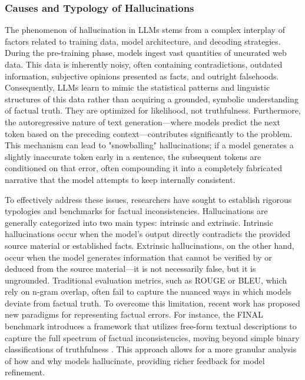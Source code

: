 \documentclass[11pt,a4paper]{article}
\begin{document}
\subsubsection{Causes and Typology of Hallucinations}

The phenomenon of hallucination in LLMs stems from a complex interplay of factors related to training data, model architecture, and decoding strategies. During the pre-training phase, models ingest vast quantities of uncurated web data. This data is inherently noisy, often containing contradictions, outdated information, subjective opinions presented as facts, and outright falsehoods. Consequently, LLMs learn to mimic the statistical patterns and linguistic structures of this data rather than acquiring a grounded, symbolic understanding of factual truth. They are optimized for likelihood, not truthfulness. Furthermore, the autoregressive nature of text generation---where models predict the next token based on the preceding context---contributes significantly to the problem. This mechanism can lead to "snowballing" hallucinations; if a model generates a slightly inaccurate token early in a sentence, the subsequent tokens are conditioned on that error, often compounding it into a completely fabricated narrative that the model attempts to keep internally consistent.

To effectively address these issues, researchers have sought to establish rigorous typologies and benchmarks for factual inconsistencies. Hallucinations are generally categorized into two main types: intrinsic and extrinsic. Intrinsic hallucinations occur when the model's output directly contradicts the provided source material or established facts. Extrinsic hallucinations, on the other hand, occur when the model generates information that cannot be verified by or deduced from the source material---it is not necessarily false, but it is ungrounded. Traditional evaluation metrics, such as ROUGE or BLEU, which rely on n-gram overlap, often fail to capture the nuanced ways in which models deviate from factual truth. To overcome this limitation, recent work has proposed new paradigms for representing factual errors. For instance, the FINAL benchmark introduces a framework that utilizes free-form textual descriptions to capture the full spectrum of factual inconsistencies, moving beyond simple binary classifications of truthfulness \cite{Peisakhovsky_2025_LLMs}. This approach allows for a more granular analysis of how and why models hallucinate, providing richer feedback for model refinement.
\end{document}
